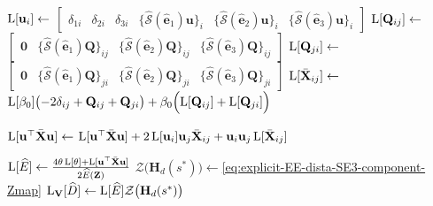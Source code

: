 \begin{algorithm}[H]
\begin{algorithmic}[1]
        \State $\operatorname{L}[\mathbf{u}_i] \gets$ $\begin{bmatrix}
            \delta_{1i} & \delta_{2i} & \delta_{3i} & \{\widehat{\mathcal{S}}(\widehat{\mathbf{e}}_1)\mathbf{u}\}_i & \{\widehat{\mathcal{S}}(\widehat{\mathbf{e}}_2)\mathbf{u}\}_i & \{\widehat{\mathcal{S}}(\widehat{\mathbf{e}}_3)\mathbf{u}\}_i 
        \end{bmatrix}$
            \State $\operatorname{L}[\mathbf{Q}_{ij}] \gets$ $\begin{bmatrix}
                \mathbf{0} & \bigl\{\widehat{\mathcal{S}}(\widehat{\mathbf{e}}_1)\mathbf{Q}\bigr\}_{ij} & \bigl\{\widehat{\mathcal{S}}(\widehat{\mathbf{e}}_2)\mathbf{Q}\bigr\}_{ij} & \bigl\{\widehat{\mathcal{S}}(\widehat{\mathbf{e}}_3)\mathbf{Q}\bigr\}_{ij}
            \end{bmatrix}$
            \State $\operatorname{L}[\mathbf{Q}_{ji}] \gets$ $\begin{bmatrix}
                \mathbf{0} & \bigl\{\widehat{\mathcal{S}}(\widehat{\mathbf{e}}_1)\mathbf{Q}\bigr\}_{ji} & \bigl\{\widehat{\mathcal{S}}(\widehat{\mathbf{e}}_2)\mathbf{Q}\bigr\}_{ji} & \bigl\{\widehat{\mathcal{S}}(\widehat{\mathbf{e}}_3)\mathbf{Q}\bigr\}_{ji}
            \end{bmatrix}$
            \State $\operatorname{L}[\bar{\mathbf{X}}_{ij}]\gets$ $\operatorname{L}[\beta_0]\bigl(-2\delta_{ij}+ \mathbf{Q}_{ij} + \mathbf{Q}_{ji}\bigr) + \beta_0\Bigl(\operatorname{L}[\mathbf{Q}_{ij}] + \operatorname{L}[\mathbf{Q}_{ji}]\Bigr)$
        
            \State $\operatorname{L}[\mathbf{u}^\top \bar{\mathbf{X}} \mathbf{u}] \gets$ $\operatorname{L}[\mathbf{u}^\top \bar{\mathbf{X}} \mathbf{u}]
            + 2\operatorname{L}[\mathbf{u}_i]\mathbf{u}_j \bar{\mathbf{X}}_{ij} 
            + \mathbf{u}_i \mathbf{u}_j \operatorname{L}[\bar{\mathbf{X}}_{ij}]
            $
        \EndFor
    \EndFor
    
    \State $\operatorname{L}[\widehat{E}] \gets \frac{4\theta\operatorname{L}[\theta] + \operatorname{L}[\mathbf{u}^\top \bar{\mathbf{X}} \mathbf{u}]}{2\widehat{E}(\mathbf{Z})}$
    \State $\mathcal{Z}\bigl(\mathbf{H}_d(s^*)\bigr) \gets$\eqref{eq:explicit-EE-dista-SE3-component-Zmap}
    \State $\operatorname{L}_\mathbf{V}[\widehat{D}] \gets \operatorname{L}[\widehat{E}]\mathcal{Z}\bigl(\mathbf{H}_d(s^*)\bigr)$
    \end{algorithmic}
\end{algorithm}